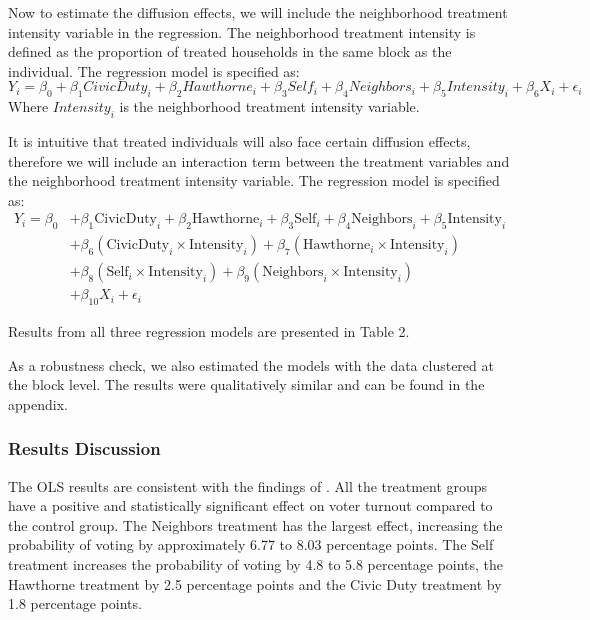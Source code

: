 \documentclass[11pt]{article}
\begin{document}
Now to estimate the diffusion effects, we will include the neighborhood treatment intensity variable in the regression. The neighborhood treatment intensity is defined as the proportion of treated households in the same block as the individual. The regression model is specified as:
\begin{equation}
    Y_i = \beta_0 + \beta_1 CivicDuty_i + \beta_2 Hawthorne_i + \beta_3 Self_i + \beta_4 Neighbors_i + \beta_5 Intensity_i + \beta_6 X_i + \epsilon_i
\end{equation}
Where $Intensity_i$ is the neighborhood treatment intensity variable. 

It is intuitive that treated individuals will also face certain diffusion effects, therefore we will include an interaction term between the treatment variables and the neighborhood treatment intensity variable. The regression model is specified as:
\begin{align*}
    Y_i = \beta_0 &+ \beta_1 \text{CivicDuty}_i + \beta_2 \text{Hawthorne}_i + \beta_3 \text{Self}_i + \beta_4 \text{Neighbors}_i + \beta_5 \text{Intensity}_i \\
    &+ \beta_6 (\text{CivicDuty}_i \times \text{Intensity}_i) + \beta_7 (\text{Hawthorne}_i \times \text{Intensity}_i) \\
    &+ \beta_8 (\text{Self}_i \times \text{Intensity}_i) + \beta_9 (\text{Neighbors}_i \times \text{Intensity}_i) \\
    &+ \beta_{10} X_i + \epsilon_i
\end{align*}

Results from all three regression models are presented in Table 2.

\begin{table}[H]
    \centering
    \caption{OLS Regression Results with Diffusion Effects}
    \vspace{-0.3cm}
    
    \label{tab:ols_diffusion}
\end{table}

As a robustness check, we also estimated the models with the data clustered at the block level. The results were qualitatively similar and can be found in the appendix.

\vspace{-0.5cm}
\subsubsection{Results Discussion}
The OLS results are consistent with the findings of \cite{gerber_social_2008}. All the treatment groups have a positive and statistically significant effect on voter turnout compared to the control group. The Neighbors treatment has the largest effect, increasing the probability of voting by approximately 6.77 to 8.03 percentage points. The Self treatment increases the probability of voting by 4.8 to 5.8 percentage points, the Hawthorne treatment by 2.5 percentage points and the Civic Duty treatment by 1.8 percentage points. 
\end{document}
